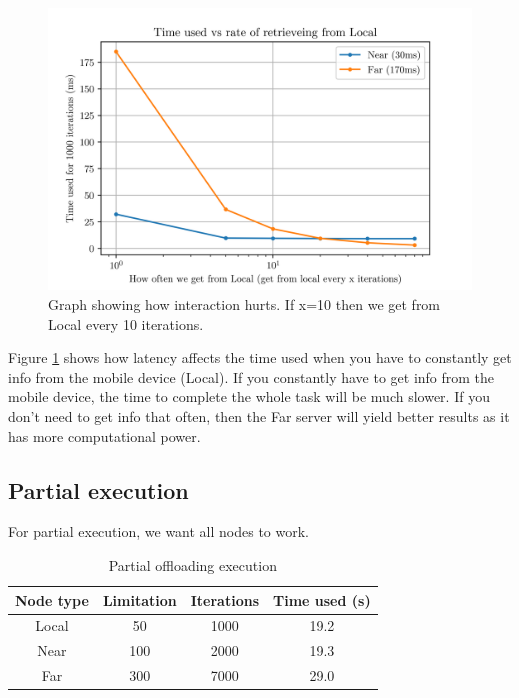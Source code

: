 \begin{figure}[t]
    \centering
    \includegraphics[scale=1]{chapters/evaluation/figures/times.png}
    \caption{Graph showing how interaction hurts. If x=10 then we get from Local every 10 iterations.}
    \label{fig:time_graph_near_far}
\end{figure}

Figure \ref{fig:time_graph_near_far} shows how latency affects the time used when you have to constantly get info from the mobile device (Local). If you constantly have to get info from the mobile device, the time to complete the whole task will be much slower. If you don't need to get info that often, then the Far server will yield better results as it has more computational power.





\subsection{Partial execution}
For partial execution, we want all nodes to work.
\begin{table}[h!]
    \centering
    \begin{tabular}[c]{|c|c|c|c|}
        \hline
        Node type & Limitation & Iterations & Time used (s)\\
        \hline
        \hline
        Local & 50 & 1000 & 19.2 \\
        \hline
        Near & 100 & 2000 & 19.3 \\
        \hline
        Far & 300 & 7000 & 29.0 \\
        \hline
    \end{tabular}
    \caption{Partial offloading execution}
    \label{tab:MEC_partial_execution}
\end{table}


